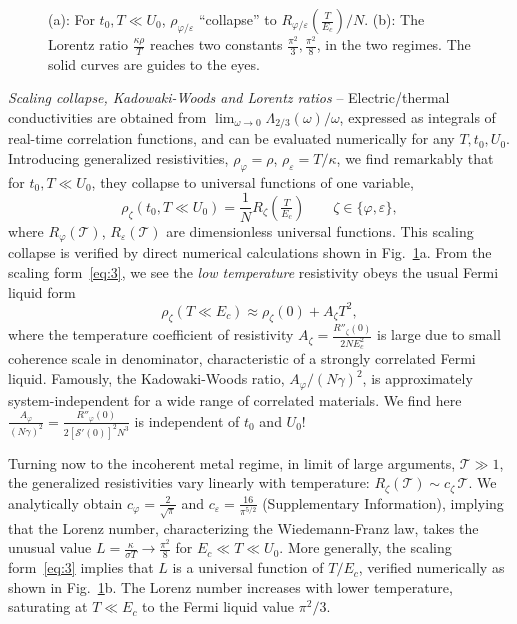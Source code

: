 \documentclass[twocolumn,floatfix,superscriptaddress]{revtex4-1}
\begin{document}
 \begin{figure}[htbp]
 \begin{center}
\caption{(a): For $t_0, T\ll U_0$, $\rho_{\varphi/\varepsilon}$ ``collapse'' to $R_{\varphi/\varepsilon}(\frac{T}{E_c})/N$. (b): The Lorentz ratio $\frac{\kappa\rho}{T}$ reaches two constants $\frac{\pi^2}{3},\frac{\pi^2}{8}$, in the two regimes. The solid curves are guides to the eyes.} \label{con}
 \end{center}
 \end{figure}
 
\emph{Scaling collapse, Kadowaki-Woods and  Lorentz ratios} -- Electric/thermal conductivities are obtained from  $\lim_{\omega\rightarrow 0} \Lambda_{2/3}(\omega)/\omega$, expressed as integrals of real-time correlation functions, and can be evaluated numerically for any $T,t_0,U_0$.  Introducing generalized resistivities, $\rho_\varphi=\rho$, $\rho_\varepsilon = T/\kappa$, we find remarkably that for $t_0, T\ll U_0$, they collapse to universal functions of one variable,
\begin{equation}
  \label{eq:3}
  \rho_\zeta(t_0,T \ll U_0) = \frac{1}{N}R_\zeta( \tfrac{T}{E_c}) \qquad \zeta\in \{\varphi,\varepsilon\},
\end{equation}
where $R_\varphi(\mathcal{T})$, $R_\varepsilon({\mathcal T})$ are dimensionless universal functions.   This scaling collapse is verified by direct numerical calculations shown in Fig.~\ref{con}a.    From the scaling form~\eqref{eq:3}, we see the {\em low temperature} resistivity obeys the usual Fermi liquid form
\begin{equation}
  \label{eq:2}
  \rho_\zeta(T \ll E_c) \approx \rho_\zeta(0) + A_\zeta T^2,
\end{equation}
where the temperature coefficient of resistivity $A_\zeta = \frac{R''_\zeta(0)}{2NE_c^2}$ is large due to small coherence scale in denominator, characteristic of a strongly correlated Fermi liquid.  Famously, the Kadowaki-Woods ratio, $A_\varphi/(N\gamma)^2$, is approximately system-independent for a wide range of correlated materials\cite{kadowaki1986universal,rice1968electron}. We find here $\frac{A_\varphi}{(N\gamma)^2} = \frac{R''_\varphi(0)}{2[\mathcal{S}'(0)]^2N^3}$ is independent of $t_0$ and $U_0$!

Turning now to the incoherent metal regime, in limit of large arguments, $\mathcal{T} \gg 1$, the generalized resistivities vary linearly with temperature: $R_\zeta(\mathcal{T}) \sim c_\zeta\, \mathcal{T}$.  We  analytically obtain $c_\varphi = \frac{2}{\sqrt{\pi}}$ and $c_\varepsilon = \frac{16}{\pi^{5/2}}$ (Supplementary Information), implying that the Lorenz number, characterizing the Wiedemann-Franz law, takes the unusual value $L=\frac{\kappa}{\sigma T}\rightarrow \frac{\pi^2}{8}$ for $E_c \ll T \ll U_0$.  More generally, the scaling form~\eqref{eq:3} implies that $L$ is a universal function of $T/E_c$, verified numerically as shown in Fig.~\ref{con}b.  The Lorenz number increases with lower temperature, saturating at $T\ll E_c$ to the Fermi liquid value $\pi^2/3$.  
 
\end{document}
